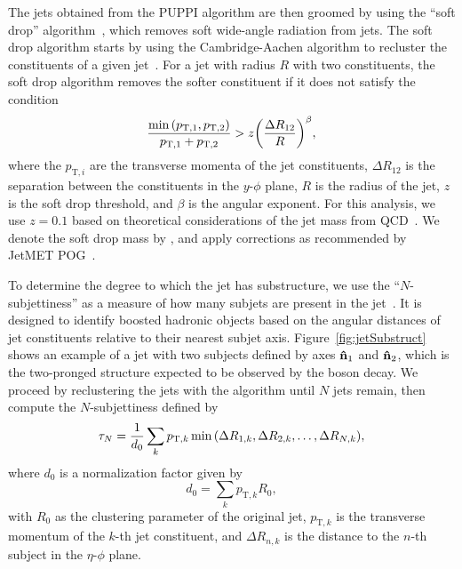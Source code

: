 The jets obtained from the PUPPI algorithm are then groomed by using the ``soft drop'' algorithm~\cite{Larkoski_2014}, which removes soft wide-angle radiation from jets.
The soft drop algorithm starts by using the Cambridge-Aachen algorithm to recluster the constituents of a given jet~\cite{Dokshitzer_1997,Wobisch:393035}.
For a jet with radius $R$ with two constituents, the soft drop algorithm removes the softer constituent if it does not satisfy the condition
\begin{equation}
  \frac{\min\pqty{p_{\mathrm{T},1},p_{\mathrm{T},2}}}{p_{\mathrm{T},1}+p_{\mathrm{T},2}}>z\pqty{\frac{\Delta R_{12}}{R}}^\beta,
\end{equation}
where the $p_{\mathrm{T},i}$ are the transverse momenta of the jet constituents, $\Delta R_{12}$ is the separation between the constituents in the $y$-$\phi$ plane, $R$ is the radius of the jet, $z$ is the soft drop threshold, and $\beta$ is the angular exponent.
For this analysis, we use $z=0.1$ based on theoretical considerations of the jet mass from QCD~\cite{Dasgupta_2013,Dasgupta_2013_2}.
We denote the soft drop mass by \MJ, and apply corrections as recommended by JetMET POG~\cite{WZ-tagging}.

To determine the degree to which the jet has substructure, we use the ``$N$-subjettiness'' as a measure of how many subjets are present in the jet~\cite{Thaler_2011,Thaler_2012}.
It is designed to identify boosted hadronic objects based on the angular distances of jet constituents relative to their nearest subjet axis.
Figure~\ref{fig:jetSubstruct} shows an example of a jet with two subjects defined by axes $\vu{n}_1$ and $\vu{n}_2$, which is the two-pronged structure expected to be observed by the \Vhad boson decay.
We proceed by reclustering the jets with the \kt algorithm until $N$ jets remain, then compute the $N$-subjettiness defined by
\begin{equation}
  \tau_N=\frac{1}{d_0}\sum_kp_{\mathrm{T},k}\min\pqty{\Delta R_{1,k},\Delta R_{2,k},\ldots,\Delta R_{N,k}},
\end{equation}
where $d_0$ is a normalization factor given by
\begin{equation}
  d_0=\sum_kp_{\mathrm{T},k}R_0,
\end{equation}
with $R_0$ as the clustering parameter of the original jet, $p_{\mathrm{T},k}$ is the transverse momentum of the $k$-th jet constituent, and $\Delta R_{n,k}$ is the distance to the $n$-th subject in the $\eta$-$\phi$ plane.

